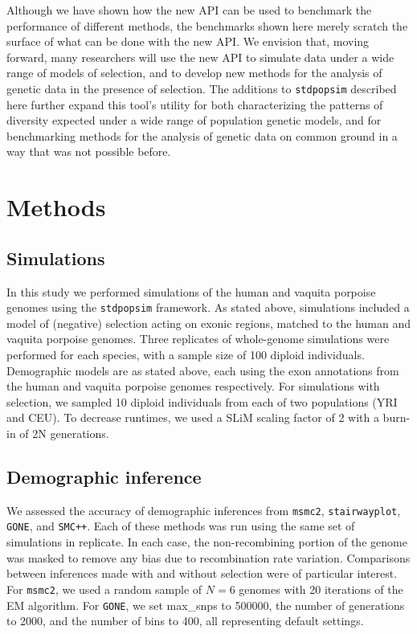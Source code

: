 \documentclass[hidelinks]{article}
\newcommand{\stdpopsim}{\texttt{stdpopsim}\xspace}
\newcommand{\msmc}{\texttt{msmc2}\xspace}
\newcommand{\stairway}{\texttt{stairwayplot}\xspace}
\newcommand{\gone}{\texttt{GONE}\xspace}
\newcommand{\smcpp}{\texttt{SMC++}\xspace}
\begin{document}
    Although we have shown how the new API can be used to benchmark the performance of different methods,
    the benchmarks shown here merely scratch the surface of what can be done with the new API.
    We envision that, moving forward, many researchers will use
    the new API to simulate data under a wide range of models of selection, and to develop
    new methods for the analysis of genetic data in the presence of selection. 
    The additions to \stdpopsim described here further expand this tool's utility for both 
    characterizing the patterns of diversity expected under a wide range of population genetic
    models, and for benchmarking methods for the analysis of genetic data
    on common ground
    in a way that was not possible before.

\section*{Methods}
    \label{methods}

    \subsection*{Simulations}
    In this study we performed simulations of the human and vaquita porpoise genomes
    using the \stdpopsim{} framework. As stated above, simulations included a model 
    of (negative) selection acting on exonic regions, matched to the human and vaquita porpoise genomes.
    Three replicates of whole-genome simulations were performed for each species, with 
    a sample size of 100 diploid individuals. Demographic models are as stated above, each
    using the exon annotations from the human and vaquita porpoise genomes respectively.
    For simulations with selection, we sampled 10 diploid individuals from each of two populations (YRI and CEU). 
    To decrease runtimes, we used a SLiM scaling factor of 2 with a burn-in of 2N generations. 

    \subsection*{Demographic inference}
    We assessed the accuracy of demographic inferences from
    \msmc \citep{Schiffels2020}, \stairway \citep{liu2020stairway}, \gone \citep{santiago2020recent}, and \smcpp \citep{terhorst2017robust}.
    Each of these methods was run using the same set of simulations in replicate.
    In each case, the non-recombining portion
    of the genome was masked to remove any bias due to recombination rate %
    variation. Comparisons between inferences made with and without selection were 
    of particular interest. For \msmc, we used a random sample of $N=6$ genomes with 20
    iterations of the EM algorithm. For \gone, we set max\_snps to 500000,
    the number of generations to 2000, and the number of bins to 400, all representing default settings.
    
\end{document}
